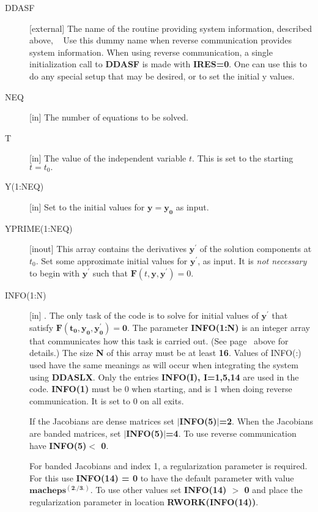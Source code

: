 \documentclass[twoside]{MATH77}
\begin{document}
\begin{description}
\item[DDASF][external] The name of the routine providing system
  information, described above, ~\pageref{DDASF} Use this dummy name
  when reverse communication provides system information.  When using
  reverse communication, a single initialization call to
  \textbf{DDASF} is made with \textbf{IRES=0}.  One can use this to do
  any special setup that may be desired, or to set the initial y values.

\item[NEQ]  [in] The number of equations to be solved.

\item[T]  [in] The value of the independent variable $t$.
  This is set to the starting $t=t_0.$
  
\item[Y(1:NEQ)] [in] Set to the initial values for $\mathbf{y=y_0}$ as input.
  
\item[YPRIME(1:NEQ)] [inout] This array contains the derivatives
  $\mathbf{y}^{\prime}$ of the solution components at $t_0$.  Set some
  approximate initial values for $\mathbf{y}^{\prime}$, as input.  It
  is \emph{not necessary} to begin with $\mathbf{y}^{\prime}$ such
  that $\mathbf{F}(t,\mathbf{y},\mathbf{y}^{\prime})=0.$


\item[INFO(1:N)] [in] . The only task of the code is to solve for
  initial values of $\mathbf{y}^{\prime}$ that satisfy
  $\mathbf{F(t_0,y_0,y^{\prime}_0)=0}$. The parameter
  \textbf{INFO(1:N)} is an integer array that communicates how this
  task is carried out. (See page~\pageref{INFO} above for details.)
  The size \textbf{N} of this array must be at least \textbf{16}.
  Values of INFO(:) used have the same meanings as will occur when
  integrating the system using \textbf{DDASLX}. Only the entries
  \textbf{INFO(I), I=1,5,14} are used in the code.  \textbf{INFO(1)}
  must be 0 when starting, and is 1 when doing reverse communication.
  It is set to 0 on all exits.

     If the Jacobians are dense matrices set \textbf{$|$INFO(5)$|$=2}.
     When the Jacobians are banded matrices, set \textbf{$|$INFO(5)$|$=4}.
  To use reverse communication have \textbf{INFO(5)$<$ 0}.  

  For banded Jacobians and index 1,  a regularization parameter is required.  For this use
     \textbf{INFO(14) = 0} to have the default parameter with value $\mathbf{macheps^{(2./3.)}}$.
     To use other values set \textbf{INFO(14) $>$ 0} and place the regularization
     parameter in location \textbf{RWORK(INFO(14))}.
  

\end{description}
\end{document}
